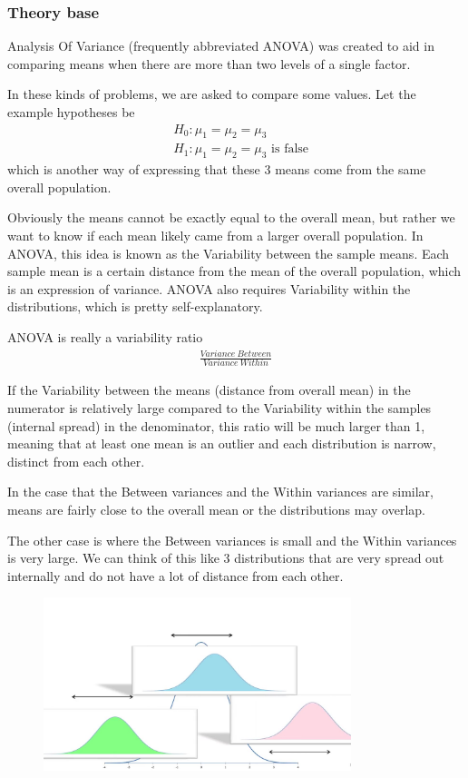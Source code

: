 \documentclass[a4paper]{article}
\numberwithin{equation}{section}
\begin{document}
\subsubsection{Theory base}\label{anovaDef}
Analysis Of Variance (frequently abbreviated ANOVA) was created to aid in comparing means when there are more than two levels of a single factor.

In these kinds of problems, we are asked to compare some values. Let the example hypotheses be
\begin{align*}
   & H_0: \mu_1 = \mu_2 = \mu_3                  \\
   & H_1: \mu_1 = \mu_2 = \mu_3 \text{ is false}
\end{align*}
which is another way of expressing that these 3 means come from the same overall population.

Obviously the means cannot be exactly equal to the overall mean, but rather we want to know if each mean likely came from a larger overall population.
In ANOVA, this idea is known as the Variability between the sample means.
Each sample mean is a certain distance from the mean of the overall population, which is an expression of variance.
ANOVA also requires Variability within the distributions, which is pretty self-explanatory.

ANOVA is really a variability ratio
\begin{align*}
  \frac{Variance\ Between}{Variance\ Within}
\end{align*}

If the Variability between the means (distance from overall mean) in the numerator is relatively large compared to the Variability within the samples (internal spread) in the denominator, this ratio will be much larger than 1, meaning that at least one mean is an outlier and each distribution is narrow, distinct from each other.

In the case that the Between variances and the Within variances are similar, means are fairly close to the overall mean or the distributions may overlap.

The other case is where the Between variances is small and the Within variances is very large.
We can think of this like 3 distributions that are very spread out internally and do not have a lot of distance from each other.
\begin{figure}[H]
  \centering
  \includegraphics[width=0.8\textwidth]{anova.jpg}
\end{figure}
\end{document}
